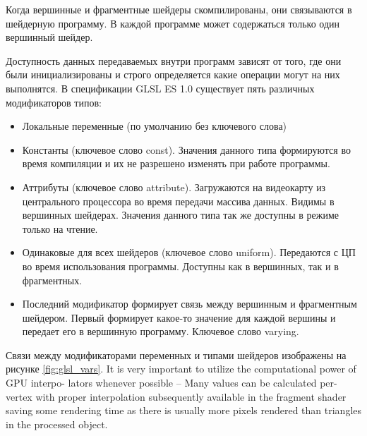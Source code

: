 Когда вершинные и фрагментные шейдеры скомпилированы, они связываются в шейдерную программу.
В каждой программе может содержаться только один вершинный шейдер.

Доступность данных передаваемых внутри программ зависят от того, где они были инициализированы
и строго определяется какие операции могут на них выполнятся. В спецификации GLSL ES 1.0 
существует пять различных модификаторов типов:

\begin{itemize}
  \item Локальные переменные (по умолчанию без ключевого слова)
  \item Константы (ключевое слово const). Значения данного типа формируются во время компиляции и их не
    разрешено изменять при работе программы.
  \item Аттрибуты (ключевое слово attribute). Загружаются на видеокарту из центрального процессора во время передачи массива данных. Видимы в 
    вершинных шейдерах. Значения данного типа так же доступны в режиме только на чтение.
  \item Одинаковые для всех шейдеров (ключевое слово uniform). Передаются с ЦП во время 
    использования программы. Доступны как в вершинных, так и в фрагментных.
  \item Последний модификатор формирует связь между вершинным и фрагментным шейдером. Первый
    формирует какое-то значение для каждой вершины и передает его в вершинную программу.
    Ключевое слово varying.
\end{itemize}

Связи между модификаторами переменных и типами шейдеров изображены на рисунке \ref{fig:glsl_vars}.
It is very important to utilize the computational power of GPU interpo- lators whenever possible – Many values can be calculated per-vertex with proper interpolation subsequently available in the fragment shader saving some rendering time as there is usually more pixels rendered than triangles in the processed object.

